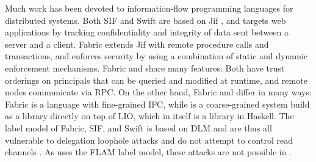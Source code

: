 Much work has been devoted to information-flow programming languages for distributed systems. Both SIF \cite{Chong:2007:SEC:1362903.1362904} and Swift \cite{Chong:2007:SWA:1294261.1294265} are based on Jif \cite{Myers:1999:JPM:292540.292561}, and targets web applications by tracking confidentiality and integrity of data sent between a server and a client. Fabric \cite{Liu:2009:FPS:1629575.1629606} extends Jif with remote procedure calls and transactions, and enforces security by using a combination of static and dynamic enforcement mechanisms. Fabric and \lang{} share many features: Both have trust orderings on principals that can be queried and modified at runtime, and remote nodes communicate via RPC. On the other hand, Fabric and \lang{} differ in many ways: Fabric is a language with fine-grained IFC, while \lang{} is a coarse-grained system build as a library directly on top of LIO, which in itself is a library in Haskell. The label model of Fabric, SIF, and Swift is based on DLM \cite{Myers:2000:PPU:363516.363526} and are thus all vulnerable to delegation loophole attacks and do not attempt to control read channels \cite{Zdancewic:2002:SPP:566340.566343}. As \lang{} uses the FLAM label model, these attacks are not possible in \lang{}.